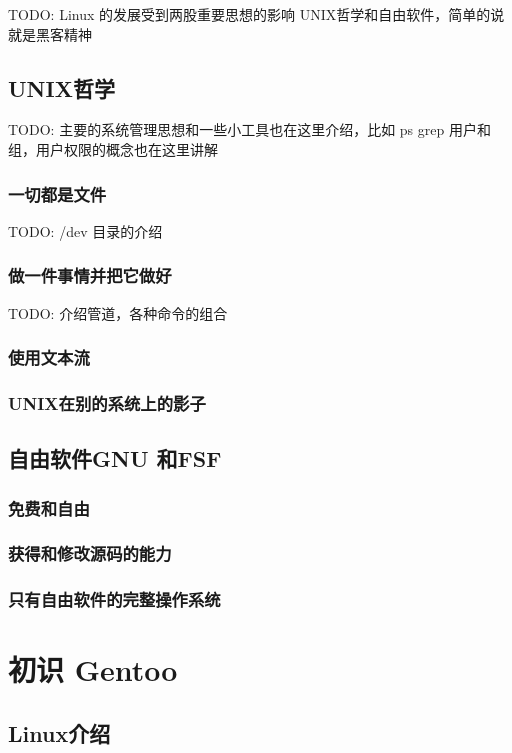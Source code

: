 \documentclass[amstex]{ctexbook}
\begin{document}
TODO:  Linux 的发展受到两股重要思想的影响 UNIX哲学和自由软件，简单的说就是黑客精神

\section{UNIX哲学}

TODO:  主要的系统管理思想和一些小工具也在这里介绍，比如 ps grep 用户和组，用户权限的概念也在这里讲解

\subsection{一切都是文件}

TODO:  /dev 目录的介绍

\subsection{做一件事情并把它做好}
TODO: 介绍管道，各种命令的组合
\subsection{使用文本流}
\subsection{UNIX在别的系统上的影子}

\section{自由软件GNU 和FSF}
\subsection{免费和自由}
\subsection{获得和修改源码的能力}
\subsection{只有自由软件的完整操作系统}

\chapter{初识 Gentoo}



\section{Linux介绍}
\end{document}
